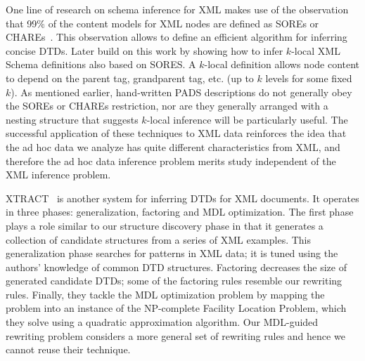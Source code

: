 One line of research on schema inference for XML makes use of the 
observation that 99\% of the content models for XML nodes are defined as
SOREs or CHAREs~\cite{martens+:expressiveness-xml-schema}. 
This observation allows \citet{bex+:dtd-inference} to define
an efficient algorithm for inferring concise DTDs.  Later 
\citet{bex+:inferring-xml-schema} build on this work 
by showing how to infer $k$-local XML Schema definitions also based on
SORES.  A $k$-local definition allows node content to depend on the parent
tag, grandparent tag, etc. (up to $k$ levels for some fixed $k$).
As mentioned earlier, hand-written PADS descriptions do not generally obey
the SOREs or CHAREs restriction, nor are they generally arranged with a nesting
structure that suggests $k$-local inference will be particularly useful.
The successful application of these techniques to XML data reinforces 
the idea that the ad hoc data we analyze has quite different characteristics
from XML, and therefore the ad hoc data inference problem merits study
independent of the XML inference problem.

XTRACT~\cite{garofalakis+:xtract} is another system for inferring DTDs
for XML documents.  It operates in three phases: generalization,
factoring and MDL optimization.  The first phase plays a role similar to
our structure discovery phase in that it generates a
collection of candidate structures from a series of XML examples.
This generalization phase searches for patterns in XML
data; it is tuned using the authors' knowledge of common DTD
structures.  Factoring decreases the size of generated candidate DTDs;
some of the factoring rules resemble our rewriting rules.
Finally, they tackle the MDL optimization problem by mapping the
problem into an instance of the NP-complete Facility Location Problem,
which they solve using a quadratic approximation algorithm.
Our MDL-guided rewriting problem considers a more general set of
rewriting rules and hence we cannot reuse their technique.



